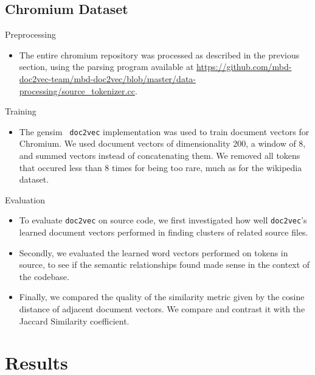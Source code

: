 \documentclass[11pt]{article}
\begin{document}
\subsection*{Chromium Dataset}
\begin{description}
  \item Preprocessing
    \begin{itemize}
      \item The entire chromium repository was processed as described in
            the previous section, using the parsing program available at
            \url{https://github.com/mbd-doc2vec-team/mbd-doc2vec/blob/master/data-processing/source_tokenizer.cc}.
    \end{itemize}
  \item Training
    \begin{itemize}
      \item The gensim~\cite{gensim} \texttt{doc2vec} implementation was used
            to train document vectors for Chromium. We used document
            vectors of dimensionality 200, a window of 8, and summed vectors
            instead of concatenating them. We removed all tokens that occured
            less than 8 times for being too rare, much as for the wikipedia dataset.
    \end{itemize}
  \item Evaluation
    \begin{itemize}
      \item To evaluate \texttt{doc2vec} on source code, we first investigated
            how well \texttt{doc2vec}'s learned document vectors performed in
            finding clusters of related source files.
      \item Secondly, we evaluated the learned word vectors performed on tokens
            in source, to see if the semantic relationships found made sense in
            the context of the codebase.
      \item Finally, we compared the quality of the similarity
            metric given by the cosine distance of adjacent document vectors.
            We compare and contrast it with the Jaccard Similarity coefficient.
    \end{itemize}
\end{description}

\renewcommand\labelitemi{\oldlabelitemi}
\section*{Results}
\end{document}
